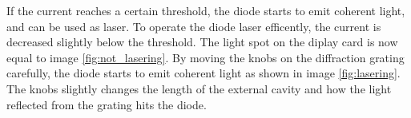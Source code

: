 If the current reaches a certain threshold, the diode starts to emit coherent
light, and can be used as laser. To operate the diode laser efficently,
the current is decreased slightly below the threshold. The light spot on the
diplay card is now equal to image \ref{fig:not_lasering}. By moving the knobs
on the diffraction grating carefully, the diode starts to emit coherent light
as shown in image \ref{fig:lasering}. The knobs slightly changes the length of
the external cavity and how the light reflected from the grating hits the diode.
